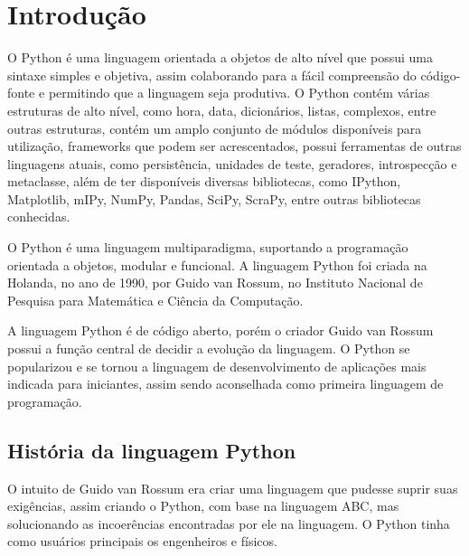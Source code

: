 


\chapter{ Introdução}

O Python é uma linguagem orientada a objetos de alto nível que possui uma sintaxe simples e objetiva, assim colaborando para a fácil compreensão do código-fonte e permitindo que a linguagem seja produtiva. O Python contém várias estruturas de alto nível, como hora, data, dicionários, listas, complexos, entre outras estruturas, contém um amplo conjunto de módulos disponíveis para utilização, frameworks que podem ser acrescentados, possui ferramentas de outras linguagens atuais, como persistência, unidades de teste, geradores, introspecção e metaclasse, além de ter disponíveis diversas bibliotecas, como IPython, Matplotlib, mIPy, NumPy, Pandas, SciPy, ScraPy, entre outras bibliotecas conhecidas.

O Python é uma linguagem multiparadigma, suportando a programação orientada a objetos, modular e funcional. A linguagem Python foi criada na Holanda, no ano de 1990, por Guido van Rossum, no Instituto Nacional de Pesquisa para Matemática e Ciência da Computação. \cite{Borges2014}

A linguagem Python é de código aberto, porém o criador Guido van Rossum possui a função central de decidir a evolução da linguagem. O Python se popularizou e se tornou a linguagem de desenvolvimento de aplicações mais indicada para iniciantes, assim sendo aconselhada como primeira linguagem de programação. \cite{Perkovic2016}




\section{História da linguagem Python}

O intuito de Guido van Rossum era criar uma linguagem que pudesse suprir suas exigências, assim criando o Python, com base na linguagem ABC, mas solucionando as incoerências encontradas por ele na linguagem. O Python tinha como usuários principais os engenheiros e físicos.


